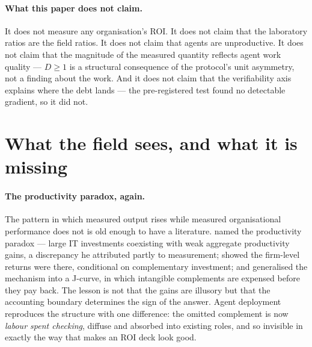 \documentclass[11pt]{article}
\newcommand{\D}{\ensuremath{D}}
\begin{document}
\paragraph{What this paper does not claim.}
It does not measure any organisation's ROI. It does not claim that the laboratory ratios are the
field ratios. It does not claim that agents are unproductive. It does not claim that the magnitude
of the measured quantity reflects agent work quality --- $\D\geq 1$ is a structural consequence of
the protocol's unit asymmetry, not a finding about the work. And it does not claim that the verifiability
axis explains where the debt lands --- the pre-registered test found no detectable gradient, so it did
not.

\section{What the field sees, and what it is missing}
\label{sec:field}

\paragraph{The productivity paradox, again.}
The pattern in which measured output rises while measured organisational performance does not is
old enough to have a literature. \citet{brynjolfsson1993} named the productivity paradox --- large
IT investments coexisting with weak aggregate productivity gains, a discrepancy he attributed
partly to measurement; \citet{brynjolfsson1996} showed the firm-level returns were there,
conditional on complementary investment; and \citet{brynjolfsson2021} generalised the mechanism
into a J-curve, in which intangible complements are expensed before they pay back. The lesson is
not that the gains are illusory but that the accounting boundary determines the sign of the
answer. Agent deployment reproduces the structure with one difference: the omitted complement is
now \emph{labour spent checking}, diffuse and absorbed into existing roles, and so invisible in
exactly the way that makes an ROI deck look good.
\end{document}
